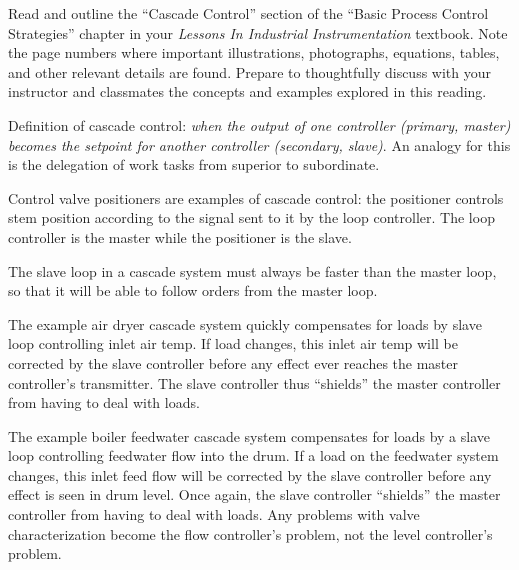 

Read and outline the ``Cascade Control'' section of the ``Basic Process Control Strategies'' chapter in your {\it Lessons In Industrial Instrumentation} textbook.  Note the page numbers where important illustrations, photographs, equations, tables, and other relevant details are found.  Prepare to thoughtfully discuss with your instructor and classmates the concepts and examples explored in this reading.














Definition of cascade control: {\it when the output of one controller (primary, master) becomes the setpoint for another controller (secondary, slave)}.  An analogy for this is the delegation of work tasks from superior to subordinate.

\vskip 10pt

Control valve positioners are examples of cascade control: the positioner controls stem position according to the signal sent to it by the loop controller.  The loop controller is the master while the positioner is the slave.

\vskip 10pt

The slave loop in a cascade system must always be faster than the master loop, so that it will be able to follow orders from the master loop.  

\vskip 10pt

The example air dryer cascade system quickly compensates for loads by slave loop controlling inlet air temp.  If load changes, this inlet air temp will be corrected by the slave controller before any effect ever reaches the master controller's transmitter.  The slave controller thus ``shields'' the master controller from having to deal with loads.

The example boiler feedwater cascade system compensates for loads by a slave loop controlling feedwater flow into the drum.  If a load on the feedwater system changes, this inlet feed flow will be corrected by the slave controller before any effect is seen in drum level.  Once again, the slave controller ``shields'' the master controller from having to deal with loads.  Any problems with valve characterization become the flow controller's problem, not the level controller's problem.


